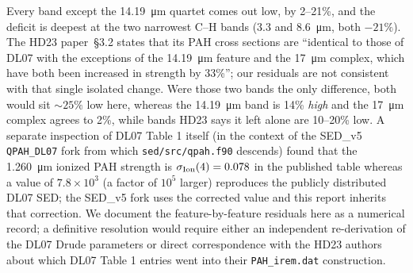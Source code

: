 \documentclass{my_memo}
\begin{document}
\medskip
\noindent Every band except the \SI{14.19}{\micro\meter} quartet comes
out low, by 2--21\%, and the deficit is deepest at the two narrowest
C--H bands (3.3 and \SI{8.6}{\micro\meter}, both $-21\%$). The HD23
paper~\S3.2 states that its PAH cross sections are ``identical to those
of DL07 with the exceptions of the \SI{14.19}{\micro\meter} feature and
the \SI{17}{\micro\meter} complex, which have both been increased in
strength by 33\%''; our residuals are not consistent with that single
isolated change. Were those two bands the only difference, both would
sit $\sim 25\%$ low here, whereas the \SI{14.19}{\micro\meter} band is
14\% \emph{high} and the \SI{17}{\micro\meter} complex agrees to 2\%,
while bands HD23 says it left alone are 10--20\% low. A separate
inspection of DL07 Table 1 itself
(in the context of the SED\_v5 \texttt{QPAH\_DL07} fork from which
\texttt{sed/src/qpah.f90} descends) found that the
\SI{1.260}{\micro\meter} ionized PAH strength is
$\sigma_{\rm Ion}(4) = 0.078$ in the published table whereas a value of
$7.8 \times 10^3$ (a factor of $10^5$ larger) reproduces the publicly
distributed DL07 SED; the SED\_v5 fork uses the corrected value and
this report inherits that correction. We document the feature-by-feature
residuals here as a numerical record; a definitive resolution would
require either an independent re-derivation of the DL07 Drude
parameters or direct correspondence with the HD23 authors about which
DL07 Table 1 entries went into their \texttt{PAH\_irem.dat}
construction.
\end{document}
